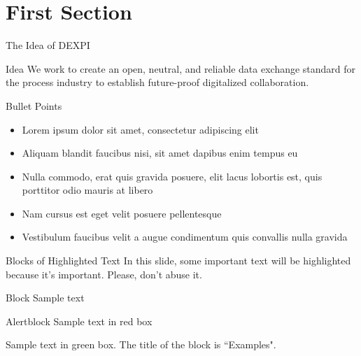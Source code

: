 \documentclass[aspectratio=169,xcolor=dvipsnames]{beamer}
\begin{document}
\section{First Section}
\begin{frame}{The Idea of DEXPI}
\begin{block}{Idea}
    We work to create an open, neutral, and reliable data exchange standard for the process industry to establish future-proof digitalized collaboration.   
\end{block}
\end{frame}


\begin{frame}{Bullet Points}
    \begin{itemize}
        \item Lorem ipsum dolor sit amet, consectetur adipiscing elit
        \item Aliquam blandit faucibus nisi, sit amet dapibus enim tempus eu
        \item Nulla commodo, erat quis gravida posuere, elit lacus lobortis est, quis porttitor odio mauris at libero
        \item Nam cursus est eget velit posuere pellentesque
        \item Vestibulum faucibus velit a augue condimentum quis convallis nulla gravida
    \end{itemize}
\end{frame}


\begin{frame}{Blocks of Highlighted Text}
    In this slide, some important text will be \alert{highlighted} because it's important. Please, don't abuse it.

    \begin{block}{Block}
        Sample text
    \end{block}

    \begin{alertblock}{Alertblock}
        Sample text in red box
    \end{alertblock}

    \begin{examples}
        Sample text in green box. The title of the block is ``Examples".
    \end{examples}
\end{frame}
\end{document}

